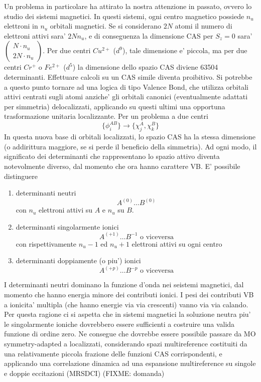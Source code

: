 Un problema in particolare ha attirato la nostra attenzione in passato,
ovvero lo studio dei sistemi magnetici.  In questi sistemi, ogni centro
magnetico possiede $n_u$ elettroni in $n_u$ orbitali magnetici. Se si
considerano $2N$ atomi il numero di elettroni attivi sara' $2 N n_u$,
e di conseguenza la dimensione CAS per $S_z=0$ sara' $
\left(
\begin{array}{c}
N \cdot n_u \\
2N \cdot n_u
\end{array}
\right)
$.
Per due centri $Cu^{2+}$ ($d^9$), tale dimensione e' piccola, ma
per due centri $Cr^+$ o $Fe^{2+}$ ($d^5$) la dimensione dello spazio
CAS diviene 63504 determinanti. Effettuare calcoli su un CAS simile
diventa proibitivo.  Si potrebbe a questo punto tornare ad una logica
di tipo Valence Bond, che utilizza orbitali attivi centrati sugli atomi
anziche' gli orbitali canonici (eventualmente adattati per simmetria)
delocalizzati, applicando su questi ultimi una opportuna trasformazione
unitaria localizzante.  Per un problema a due centri 
$$ 
\{\phi_i^{AB}\} \rightarrow \{\chi_j^A , \chi_k^B\} 
$$ 
In questa nuova base di orbitali localizzati, lo spazio CAS ha la
stessa dimensione (o addirittura maggiore, se si perde il beneficio
della simmetria). Ad ogni modo, il significato dei determinanti
che rappresentano lo spazio attivo diventa notevolmente diverso,
dal momento che ora hanno carattere VB. E' possibile distinguere
\begin{enumerate} 
\item determinanti neutri 
$$
A^{(0)} \ldots B^{(0)}
$$
con $n_u$ elettroni attivi su $A$ e $n_u$ su $B$.  
\item determinanti singolarmente ionici 
$$ 
A^{(+1)} \ldots B^{-1} \mbox{ o viceversa} 
$$
con rispettivamente $n_u - 1$ ed $n_u + 1$ elettroni attivi su ogni
centro \item determinanti doppiamente (o piu') ionici
$$ 
A^{(+p)} \ldots B^{-p} \mbox{ o viceversa}
$$ 
\end{enumerate}

I determinanti neutri dominano la funzione d'onda nei seistemi
magnetici, dal momento che hanno energia minore dei contributi
ionici. I pesi dei contributi VB a ionicita' multipla (che hanno
energie via via crescenti) vanno via via calando. Per questa ragione
ci si aspetta che in sistemi magnetici la soluzione neutra piu'
le singolarmente ioniche dovrebbero essere sufficienti a costruire
una valida funzione di ordine zero.  Ne consegue che dovrebbe
essere possibile passare da MO symmetry-adapted a localizzati,
considerando spazi multireference costituiti da una relativamente
piccola frazione delle funzioni CAS corrispondenti, e applicando una
correlazione dinamica ad una espansione multireference su singole e
doppie eccitazioni (MRSDCI) (FIXME: domanda)

